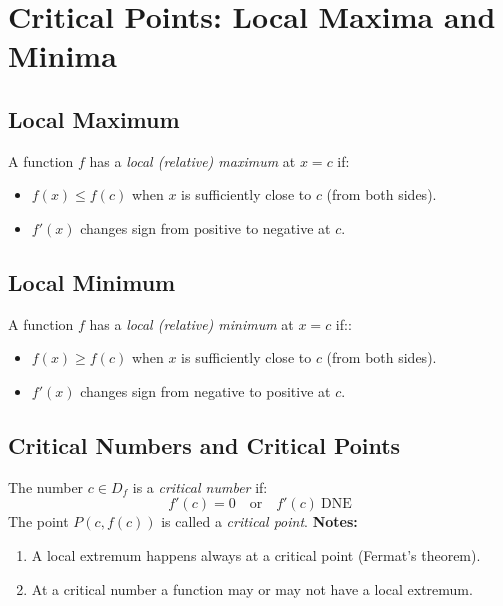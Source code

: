 \section{Critical Points: Local Maxima and Minima}
\setcounter{subsection}{1}
\subsection{Local Maximum}
	A function $f$ has a \emph{local (relative) maximum} at $x=c$ if:
	\begin{itemize}
		\item $f(x) \leq f(c)$ when $x$ is sufficiently close to $c$ (from both sides).
		\item $f'(x)$ changes sign from positive to negative at $c$.
	\end{itemize}
\subsection{Local Minimum}
	A function $f$ has a \emph{local (relative) minimum} at $x=c$ if::
	\begin{itemize}
		\item $f(x) \geq f(c)$ when $x$ is sufficiently close to $c$ (from both sides).
		\item $f'(x)$ changes sign from negative to positive at $c$.
	\end{itemize}
\subsection{Critical Numbers and Critical Points}
	The number $c \in D_f$ is a \emph{critical number} if:
	\[f'(c) = 0 \quad \text{or} \quad f'(c)\ \mathrm{DNE}\]
	The point $P(c,f(c))$ is called a \emph{critical point}.
	\textbf{Notes:}
	\begin{enumerate}
		\item A local extremum happens always at a critical point (Fermat's theorem).
		\item At a critical number a function may or may not have a local extremum.
	\end{enumerate}
